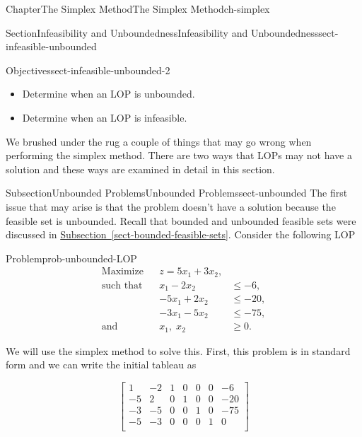 \documentclass[oneside,10pt,]{book}
\newcommand{\xreffont}{\relax}
\numberwithin{equation}{section}
\newcommand{\amp}{&}
\begin{document}
\begin{chapterptx}{Chapter}{The Simplex Method}{}{The Simplex Method}{}{}{ch-simplex}
\begin{sectionptx}{Section}{Infeasibility and Unboundedness}{}{Infeasibility and Unboundedness}{}{}{sect-infeasible-unbounded}
\begin{objectives}{Objectives}{sect-infeasible-unbounded-2}
%
\begin{itemize}[label=\textbullet]
\item{}Determine when an LOP is unbounded.%
\item{}Determine when an LOP is infeasible.%
\end{itemize}
\end{objectives}
\begin{introduction}{}%
We brushed under the rug a couple of things that may go wrong when performing the simplex method. There are two ways that LOPs may not have a solution and these ways are examined in detail in this section.%
\end{introduction}%
%
%
\typeout{************************************************}
\typeout{************************************************}
%
\begin{subsectionptx}{Subsection}{Unbounded Problems}{}{Unbounded Problems}{}{}{sect-unbounded}
The first issue that may arise is that the problem doesn't have a solution because the feasible set is unbounded.  Recall that bounded and unbounded feasible sets were discussed in \hyperref[sect-bounded-feasible-sets]{Subsection~{\xreffont\ref{sect-bounded-feasible-sets}}}. Consider the following LOP%
\begin{problem}{Problem}{}{prob-unbounded-LOP}%
%
\begin{equation*}
\begin{aligned} \text{Maximize} \amp\amp z  = 5x_1 + 3x_2, \\ \text{such that} \amp\amp  x_1 -2x_2 \amp \leq -6, \\ \amp\amp -5x_1 +2x_2 \amp \leq -20, \\ \amp\amp -3x_1 - 5x_2 \amp \leq -75,\\ \text{and} \amp\amp x_1,\; x_2 \amp \geq 0.
\end{aligned}
\end{equation*}
%
\end{problem}
We will use the simplex method to solve this. First, this problem is in standard form and we can write the initial tableau as%
\par
%
\begin{equation*}
\left[\begin{array}{rr|rrrr|r} 1 \amp -2 \amp 1 \amp 0 \amp 0 \amp 0 \amp -6\\ -5 \amp 2 \amp 0 \amp 1 \amp 0 \amp 0 \amp -20\\ -3 \amp -5 \amp 0 \amp 0 \amp 1 \amp 0 \amp -75\\ \hline -5 \amp -3 \amp 0 \amp 0 \amp 0 \amp 1 \amp 0\\ \end{array} \right]

\end{equation*}
\end{subsectionptx}
\end{sectionptx}
\end{chapterptx}
\end{document}
